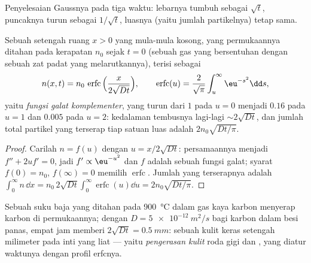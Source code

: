 \begin{omfigure}

{\small Penyelesaian Gaussnya pada tiga waktu: lebarnya tumbuh sebagai
$\sqrt t$, puncaknya turun sebagai $1/\sqrt t$, luasnya (yaitu jumlah
partikelnya) tetap sama.}
\end{omfigure}

\begin{proposition}\label{prop:b2:particle-diffusion:erfc}
Sebuah setengah ruang $x > 0$ yang mula-mula kosong, yang permukaannya ditahan pada
kerapatan $n_0$ sejak $t = 0$ (sebuah gas yang bersentuhan dengan sebuah zat padat yang
melarutkannya), terisi sebagai
\[
n(x,t) = n_0\,\operatorname{erfc}\Big(\frac{x}{2\sqrt{Dt}}\Big),
\qquad
\operatorname{erfc}(u) = \frac{2}{\sqrt\pi}\int_u^{\infty}\eu^{-s^2}\dd s,
\]
yaitu \emph{fungsi galat komplementer}, yang turun dari $1$ pada $u =
0$ menjadi $0.16$ pada $u = 1$ dan $0.005$ pada $u = 2$: kedalaman tembusnya
lagi-lagi $\sim 2\sqrt{Dt}$, dan jumlah total partikel yang terserap tiap
satuan luas adalah $2n_0\sqrt{Dt/\pi}$.
\end{proposition}

\begin{proof}
Carilah $n = f(u)$ dengan $u = x/2\sqrt{Dt}$: persamaannya menjadi
$f'' + 2uf' = 0$, jadi $f' \propto \eu^{-u^2}$ dan $f$ adalah sebuah fungsi
galat; syarat $f(0) = n_0$, $f(\infty) = 0$ memilih
$\operatorname{erfc}$. Jumlah yang terserapnya adalah $\int_0^\infty n\,\dd x =
n_0\,2\sqrt{Dt}\int_0^\infty\operatorname{erfc}(u)\dd u = 2n_0\sqrt{Dt/\pi}$.
\end{proof}

\begin{example}\label{ex:b2:particle-diffusion:carburising}
Sebuah suku baja yang ditahan pada \qty{900}{\celsius} dalam gas kaya karbon menyerap
karbon di permukaannya; dengan $D = \qty{5e-12}{m^2/s}$ bagi karbon dalam besi
panas, empat jam memberi $2\sqrt{Dt} = \qty{0.5}{mm}$: sebuah kulit keras setengah
milimeter pada inti yang liat --- yaitu \emph{pengerasan kulit} roda gigi dan
, yang diatur waktunya dengan profil erfcnya.
\end{example}


